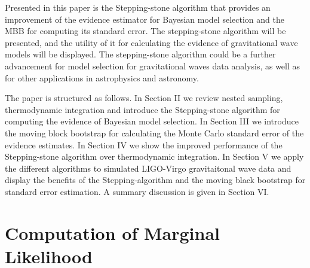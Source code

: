 \documentclass[aps,reprint,amsmath,amssymb,showpacs,showkeys]{revtex4-1}%
\newcommand{\cb}{ \color{blue}}
\begin{document}
Presented in this paper is the Stepping-stone algorithm that provides an improvement of the evidence estimator for Bayesian model selection and the MBB for computing its standard error. The stepping-stone algorithm will be presented, and the utility of it for calculating the evidence of gravitational wave models will be displayed. The stepping-stone algorithm could be a further advancement for model selection for gravitational waves data analysis, as well as for other applications in astrophysics and astronomy.%














The paper is structured as follows. In Section II we review nested sampling, thermodynamic integration and introduce the Stepping-stone algorithm for computing the evidence of Bayesian model selection. In Section III we introduce the moving block bootstrap for calculating the Monte Carlo standard error of the evidence estimates. In Section IV we show the improved performance of the Stepping-stone algorithm over thermodynamic integration. In Section V we apply the different algorithms to simulated LIGO-Virgo gravitaitonal wave data and display the benefits of the Stepping-algorithm and the moving black bootstrap for standard error estimation. A summary discussion is given in Section VI.



\section{Computation of Marginal Likelihood}
\end{document}

